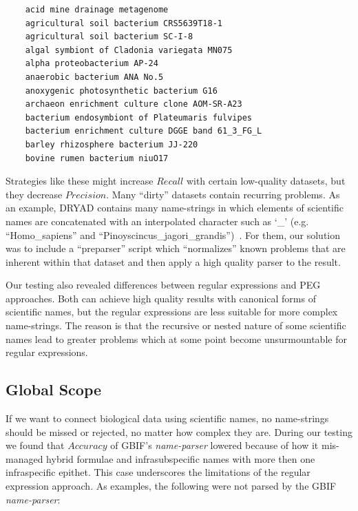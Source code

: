 \documentclass{bmcart}
\begin{document}
\begin{verbatim}
    acid mine drainage metagenome
    agricultural soil bacterium CRS5639T18-1
    agricultural soil bacterium SC-I-8
    algal symbiont of Cladonia variegata MN075
    alpha proteobacterium AP-24
    anaerobic bacterium ANA No.5
    anoxygenic photosynthetic bacterium G16
    archaeon enrichment culture clone AOM-SR-A23
    bacterium endosymbiont of Plateumaris fulvipes
    bacterium enrichment culture DGGE band 61_3_FG_L
    barley rhizosphere bacterium JJ-220
    bovine rumen bacterium niuO17
\end{verbatim}

\vspace{0.5cm}

Strategies like these might increase $Recall$ with certain low-quality datasets, but they decrease $Precision$. Many ``dirty'' datasets contain recurring problems. As an example, DRYAD contains many name-strings in which elements of scientific names are concatenated with an interpolated character such as `\_’ (e.g. ``Homo\_sapiens'' and ``Pinoyscincus\_jagori\_grandis'')~\cite{Patterson2016}. For them, our solution was to include a ``preparser'' script which ``normalizes'' known problems that are inherent within that dataset and then apply a high quality parser to the result.

Our testing also revealed differences between regular expressions and PEG approaches. Both can achieve high quality results with canonical forms of scientific names, but the regular expressions are less suitable for more complex name-strings. The reason is that the recursive or nested nature of some scientific names lead to greater problems which at some point become unsurmountable for regular expressions.

\subsection*{Global Scope}

If we want to connect biological data using scientific names, no name-strings should be missed or rejected, no matter how complex they are. During our testing we found that $Accuracy$ of GBIF's \textit{name-parser} lowered because of how it mis-managed  hybrid formulae and infrasubspecific names with more then one infraspecific epithet. This case underscores the limitations of the regular expression approach. As examples, the following were not parsed by the GBIF \textit{name-parser}:

\vspace{0.5cm}
\end{document}
